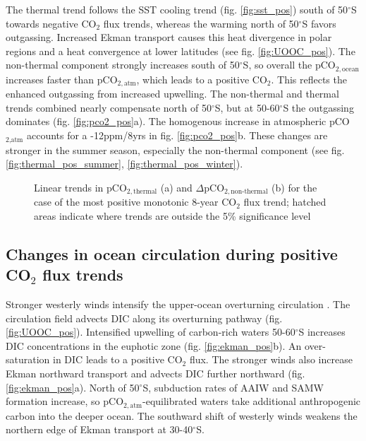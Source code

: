 The thermal trend follows the \acs{SST} cooling trend (fig. \ref{fig:sst_pos}) south of 50$^\circ$S towards negative CO$_2$ flux trends, whereas the warming north of 50$^\circ$S favors outgassing. Increased Ekman transport causes this heat divergence in polar regions and a heat convergence at lower latitudes \citep{Hall2002} (see fig. \ref{fig:UOOC_pos}). The non-thermal component strongly increases south of 50$^\circ$S, so overall the pCO$_{2,\text{ocean}}$ increases faster than pCO$_{2,\text{atm}}$, which leads to a positive CO$_2$. This reflects the enhanced outgassing from increased upwelling. The non-thermal and thermal trends combined nearly compensate north of 50$^\circ$S, but at 50-60$^\circ$S the outgassing dominates (fig. \ref{fig:pco2_pos}a). The homogenous increase in atmospheric pCO$_{\text{2,atm}}$ accounts for a -12ppm/8yrs in fig. \ref{fig:pco2_pos}b. 
These changes are stronger in the summer season, especially the non-thermal component (see fig. \ref{fig:thermal_pos_summer}, \ref{fig:thermal_pos_winter}). 

\begin{figure}[h!]
\centering
	\caption{Linear trends in pCO$_{2,\text{thermal}}$ (a) and $\Delta$pCO$_{2,\text{non-thermal}}$ (b) for the case of the most positive monotonic 8-year CO$_2$ flux trend; hatched areas indicate where trends are outside the 5\% significance level}
	\label{fig:thermal_pos}
\end{figure}



\clearpage

\subsection{Changes in ocean circulation during positive CO$_2$ flux trends}
\label{sec:trends_pos_circulation}

Stronger westerly winds intensify the upper-ocean overturning circulation \citep{Lauderdale2013}. The circulation field advects \acs{DIC} along its overturning pathway (fig. \ref{fig:UOOC_pos}). Intensified upwelling of carbon-rich waters 50-60$^\circ$S increases \acs{DIC} concentrations in the euphotic zone (fig. \ref{fig:ekman_pos}b). An over-saturation in \acs{DIC} leads to a positive CO$_2$ flux. The stronger winds also increase Ekman northward transport and advects \acs{DIC} further northward (fig. \ref{fig:ekman_pos}a). North of 50$^\circ$S, subduction rates of \ac{AAIW} and \ac{SAMW} formation increase, so pCO$_{2,\text{atm}}$-equilibrated waters take additional anthropogenic carbon into the deeper ocean. The southward shift of westerly winds weakens the northern edge of Ekman transport at 30-40$^\circ$S. 

